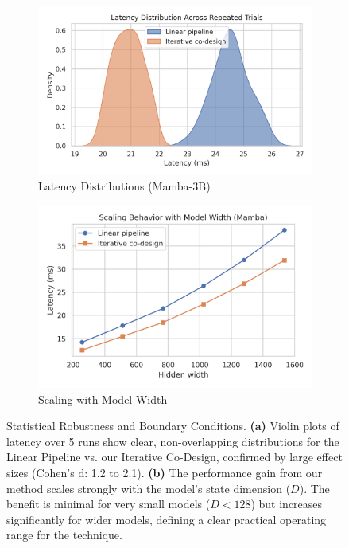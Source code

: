 \documentclass{article}
\begin{document}


\begin{figure}[hbt!]
    \centering
    \begin{subfigure}[b]{0.48\textwidth}
        \centering
        \includegraphics[width=\textwidth]{figures/latency_distributions.png}
        \caption{Latency Distributions (Mamba-3B)}
        \label{fig:latency_dist}
    \end{subfigure}
    \hfill
    \begin{subfigure}[b]{0.48\textwidth}
        \centering
        \includegraphics[width=\textwidth]{figures/scaling_with_width.png}
        \caption{Scaling with Model Width}
        \label{fig:scaling}
    \end{subfigure}
    \caption{Statistical Robustness and Boundary Conditions. \textbf{(a)} Violin plots of latency over 5 runs show clear, non-overlapping distributions for the Linear Pipeline vs. our Iterative Co-Design, confirmed by large effect sizes (Cohen's d: 1.2 to 2.1). \textbf{(b)} The performance gain from our method scales strongly with the model's state dimension ($D$). The benefit is minimal for very small models ($D < 128$) but increases significantly for wider models, defining a clear practical operating range for the technique.}
    \label{fig:stats_and_scaling}
\end{figure}
\end{document}
